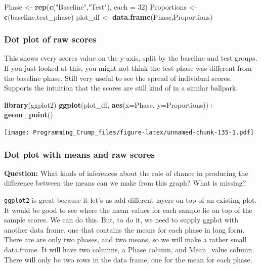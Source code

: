\documentclass[]{book}
\newenvironment{Shaded}{\begin{snugshade}}{\end{snugshade}}
\newcommand{\KeywordTok}[1]{\textcolor[rgb]{0.13,0.29,0.53}{\textbf{{#1}}}}
\newcommand{\DataTypeTok}[1]{\textcolor[rgb]{0.13,0.29,0.53}{{#1}}}
\newcommand{\DecValTok}[1]{\textcolor[rgb]{0.00,0.00,0.81}{{#1}}}
\newcommand{\StringTok}[1]{\textcolor[rgb]{0.31,0.60,0.02}{{#1}}}
\newcommand{\NormalTok}[1]{{#1}}
\theoremstyle{definition}
\theoremstyle{definition}
\theoremstyle{definition}
\theoremstyle{remark}
\begin{document}
\begin{Shaded}
\begin{Highlighting}[]
\NormalTok{Phase <-}\StringTok{ }\KeywordTok{rep}\NormalTok{(}\KeywordTok{c}\NormalTok{(}\StringTok{"Baseline"}\NormalTok{,}\StringTok{"Test"}\NormalTok{), }\DataTypeTok{each =} \DecValTok{32}\NormalTok{)}
\NormalTok{Proportions <-}\StringTok{ }\KeywordTok{c}\NormalTok{(baseline,test_phase)}
\NormalTok{plot_df <-}\StringTok{ }\KeywordTok{data.frame}\NormalTok{(Phase,Proportions)}
\end{Highlighting}
\end{Shaded}

\subsubsection{Dot plot of raw scores}\label{dot-plot-of-raw-scores}

This shows every scores value on the y-axis, split by the baseline and
test groups. If you just looked at this, you might not think the test
phase was different from the baseline phase. Still very useful to see
the spread of individual scores. Supports the intuition that the scores
are still kind of in a similar ballpark.

\begin{Shaded}
\begin{Highlighting}[]
\KeywordTok{library}\NormalTok{(ggplot2)}
\KeywordTok{ggplot}\NormalTok{(plot_df, }\KeywordTok{aes}\NormalTok{(}\DataTypeTok{x=}\NormalTok{Phase, }\DataTypeTok{y=}\NormalTok{Proportions))+}
\StringTok{  }\KeywordTok{geom_point}\NormalTok{()}
\end{Highlighting}
\end{Shaded}

\texttt{[image: Programming\_Crump\_files/figure-latex/unnamed-chunk-135-1.pdf]}

\subsubsection{Dot plot with means and raw
scores}\label{dot-plot-with-means-and-raw-scores}

\textbf{Question:} What kinds of inferences about the role of chance in
producing the difference between the means can we make from this graph?
What is missing?

\texttt{ggplot2} is great because it let's us add different layers on
top of an existing plot. It would be good to see where the mean values
for each sample lie on top of the sample scores. We can do this. But, to
do it, we need to supply ggplot with another data frame, one that
contains the means for each phase in long form. There are are only two
phases, and two means, so we will make a rather small data.frame. It
will have two columns, a Phase column, and Mean\_value column. There
will only be two rows in the data frame, one for the mean for each
phase.
\end{document}
